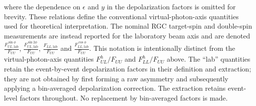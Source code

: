 where the dependence on $\epsilon$ and $y$ in the depolarization factors is omitted for brevity.  These relations define the conventional virtual-photon-axis quantities used for theoretical interpretation.  The nominal RGC target-spin and double-spin measurements are instead reported for the laboratory beam axis and are denoted $\frac{F_{UL,\mathrm{lab}}^{\sin\phi}}{F_{UU}}$, $\frac{F_{UL,\mathrm{lab}}^{\sin2\phi}}{F_{UU}}$, $\frac{F_{LL,\mathrm{lab}}}{F_{UU}}$ and $\frac{F_{LL,\mathrm{lab}}^{\cos\phi}}{F_{UU}}$.  This notation is intentionally distinct from the virtual-photon-axis quantities $F_{UL}^{h}/F_{UU}$ and $F_{LL}^{h}/F_{UU}$ above.  The ``lab'' quantities retain the event-by-event depolarization factors in their definition and extraction; they are not obtained by first forming a raw asymmetry and subsequently applying a bin-averaged depolarization correction. The extraction retains event-level factors throughout. No replacement by bin-averaged factors is made.

